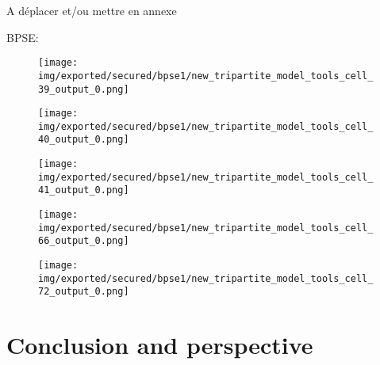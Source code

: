 \documentclass[table]{report}
\begin{document}
A déplacer et/ou mettre en annexe

BPSE:
\begin{figure}[h]%
\centering
\texttt{[image: img/exported/secured/bpse1/new\_tripartite\_model\_tools\_cell\_39\_output\_0.png]}
\caption{}
\label{fig:graphs}
\end{figure}
\FloatBarrier

\begin{figure}[h]%
\centering
\texttt{[image: img/exported/secured/bpse1/new\_tripartite\_model\_tools\_cell\_40\_output\_0.png]}
\caption{}
\label{fig:graphs}
\end{figure}
\FloatBarrier


\begin{figure}[h]%
\centering
\texttt{[image: img/exported/secured/bpse1/new\_tripartite\_model\_tools\_cell\_41\_output\_0.png]}
\caption{}
\label{fig:graphs}
\end{figure}
\FloatBarrier


\begin{figure}[h]%
\centering
\texttt{[image: img/exported/secured/bpse1/new\_tripartite\_model\_tools\_cell\_66\_output\_0.png]}
\caption{}
\label{fig:graphs}
\end{figure}
\FloatBarrier

\begin{figure}[h]%
\centering
\texttt{[image: img/exported/secured/bpse1/new\_tripartite\_model\_tools\_cell\_72\_output\_0.png]}
\caption{}
\label{fig:graphs}
\end{figure}
\FloatBarrier



\chapter{Conclusion and perspective}
\minitoc
%



\nocite{*}






\end{document}

